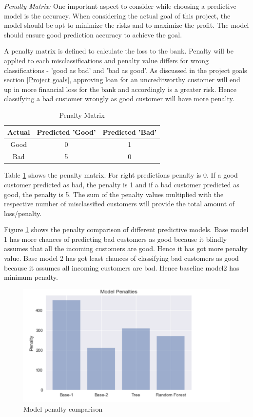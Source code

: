 \documentclass[sigconf]{acmart}
\begin{document}
\textit{Penalty Matrix:} One important aspect to consider while choosing a predictive model is the accuracy. When considering the actual goal of this project, the model should be apt to minimize the risks and to maximize the profit. The model should ensure good prediction accuracy to achieve the goal. 

A penalty matrix is defined to calculate the loss to the bank. Penalty will be applied to each misclassifications and penalty value differs for wrong classifications - 'good as bad' and 'bad as good'. As discussed in the project goals section \ref{Project goals}, approving loan for an uncreditworthy customer will end up in more financial loss for the bank and accordingly is a greater risk. Hence classifying a bad customer wrongly as good customer will have more penalty.  

\begin{table}
  \caption{Penalty Matrix
  \cite{psu-site}}
  \label{tab:table4}
  \begin{tabular}{ccc}
    \toprule
     Actual& Predicted 'Good'& Predicted 'Bad'\\
    \midrule
    Good& 0& 1\\
    Bad& 5& 0\\
    \bottomrule
  \end{tabular}
\end{table}

Table \ref{tab:table4} shows the penalty matrix. For right predictions penalty is 0. If a good customer predicted as bad, the penalty is 1 and if a bad customer predicted as good, the penalty is 5. The sum of the penalty values multiplied with the respective number of misclassified customers will provide the total amount of loss/penalty.

Figure \ref{fig:Figure26} shows the penalty comparison of different predictive models. Base model 1 has more chances of predicting bad customers as good because it blindly assumes that all the incoming customers are good. Hence it has got more penalty value. Base model 2 has got least chances of classifying bad customers as good because it assumes all incoming customers are bad. Hence baseline model2 has minimum penalty. 

\begin{figure}[htb]
  \centering
  \includegraphics[width=1.0\columnwidth]{images/Figure26.png}
  \caption{Model penalty comparison}
  \label{fig:Figure26} 
\end{figure}
\end{document}
